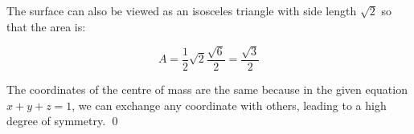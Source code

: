 \documentclass[12pt]{article}
\begin{document}
The surface can also be viewed as an isosceles triangle with side length $\sqrt{2}$ so that the area is:

\begin{equation}
    A = \frac{1}{2} \sqrt{2} \frac{\sqrt{6}}{2} = \frac{\sqrt{3}}{2}
\end{equation}

The coordinates of the centre of mass are the same because in the given equation $x + y + z = 1$, we can exchange any coordinate with others, leading to a high degree of symmetry.
\qed
\end{document}
